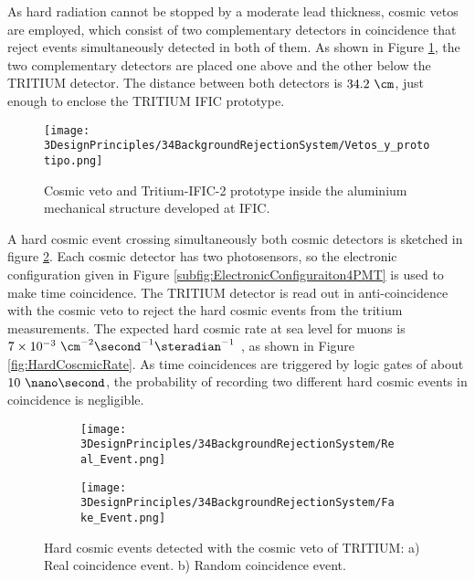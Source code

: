 As hard radiation cannot be stopped by a moderate lead thickness, cosmic vetos are employed, which consist of two complementary detectors in coincidence that reject events simultaneously detected in both of them. As shown in Figure \ref{fig:VetoAndPrototype}, the two complementary detectors are placed one above and the other below the TRITIUM detector. The distance between both detectors is $34.2~\cm$, just enough to enclose the TRITIUM IFIC prototype.

\begin{figure}[h]
\centering
\texttt{[image: 3DesignPrinciples/34BackgroundRejectionSystem/Vetos\_y\_prototipo.png]}
\caption{Cosmic veto and Tritium-IFIC-2 prototype inside the aluminium mechanical structure developed at IFIC.\label{fig:VetoAndPrototype}}
\end{figure}

A hard cosmic event crossing simultaneously both cosmic detectors is sketched in figure \ref{subfig:RealHardCosmicEvent}. Each cosmic detector has two photosensors, so the electronic configuration given in Figure \ref{subfig:ElectronicConfiguraiton4PMT} is used to make time coincidence. The TRITIUM detector is read out in anti-coincidence with the cosmic veto to reject the hard cosmic events from the tritium measurements. The expected hard cosmic rate at sea level for muons is $7\times 10^{-3}~\cm^{-2}\second^{-1}\steradian^{-1}$ \cite{PDG, HardCosmicMuonRate}, as shown in Figure \ref{fig:HardCoscmicRate}. As time coincidences are triggered by logic gates of about $10~\nano\second$, the probability of recording two different hard cosmic events in coincidence is negligible.

\begin{figure}[h]
\centering
    \begin{subfigure}[b]{0.45\textwidth}
    \centering
    \texttt{[image: 3DesignPrinciples/34BackgroundRejectionSystem/Real\_Event.png]}  
    \caption{\label{subfig:RealHardCosmicEvent}}
    \end{subfigure}
    \hfill
    \begin{subfigure}[b]{0.45\textwidth}
    \centering
    \texttt{[image: 3DesignPrinciples/34BackgroundRejectionSystem/Fake\_Event.png]}  
    \caption{\label{subfig:FakeHardCosmicEvent}}
    \end{subfigure}
   \caption{Hard cosmic events detected with the cosmic veto of TRITIUM: a) Real coincidence event. b) Random coincidence event.}
 \label{fig:HardCosmicEventsSimulation}
\end{figure}


